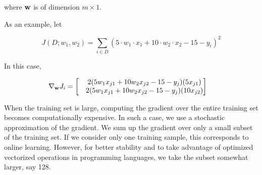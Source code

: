 \documentclass{article}
\begin{document}
where ${\bf w}$ is of dimension $m \times 1$.

As an example, let

\begin{equation}
J(D; w_1, w_2) = \sum_{i \in D}(5 \cdot w_1 \cdot x_1 + 10 \cdot w_2 \cdot x_2  - 15  - y_i)^2 
\end{equation}

In this case,

\begin{align}
\nabla_{\bf w} J_i &= 
\begin{bmatrix}
& 2 (5 w_1 x_{j1} + 10 w_2 x_{j2} - 15 - y_j)(5 x_{j1}) \\
& 2 (5 w_1 x_{j1} + 10 w_2 x_{j2} - 15 - y_j)(10 x_{j2}) \\
\end{bmatrix}
\end{align}

When the training set is large, computing the gradient over the entire training set becomes computationally expensive. In such a case, we use a stochastic approximation of the gradient. We sum up the gradient over only a small subset of the training set. If we consider only one training sample, this corresponds to online learning. However, for better stability and to take advantage of optimized vectorized operations in programming languages, we take the subset somewhat larger, say 128. 

\newpage


\end{document}
